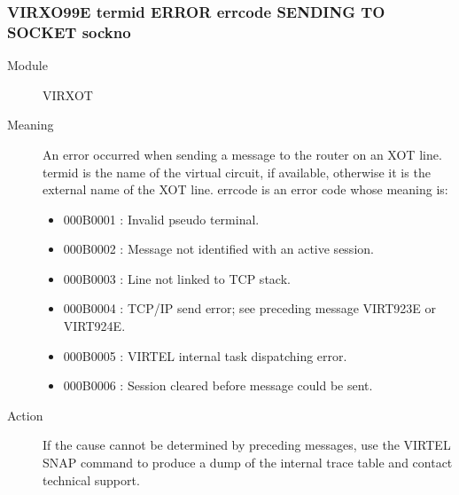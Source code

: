 \documentclass[letterpaper,10pt,english]{sphinxmanual}
\begin{document}
\subsubsection{VIRXO99E termid ERROR errcode SENDING TO SOCKET sockno}
\label{\detokenize{messages:virxo99e-termid-error-errcode-sending-to-socket-sockno}}\begin{description}
\item[{Module}] \leavevmode
VIRXOT

\item[{Meaning}] \leavevmode
An error occurred when sending a message to the router on an XOT line. termid is the name of the virtual circuit, if available, otherwise it is the external name of the XOT line. errcode is an error code whose meaning is:
\begin{itemize}
\item {} 
000B0001 : Invalid pseudo terminal.

\item {} 
000B0002 : Message not identified with an active session.

\item {} 
000B0003 : Line not linked to TCP stack.

\item {} 
000B0004 : TCP/IP send error; see preceding message VIRT923E or VIRT924E.

\item {} 
000B0005 : VIRTEL internal task dispatching error.

\item {} 
000B0006 : Session cleared before message could be sent.

\end{itemize}

\item[{Action}] \leavevmode
If the cause cannot be determined by preceding messages, use the VIRTEL SNAP command to produce a dump of the internal trace table and contact technical support.

\end{description}



\renewcommand{\indexname}{Index}
\printindex
\end{document}
